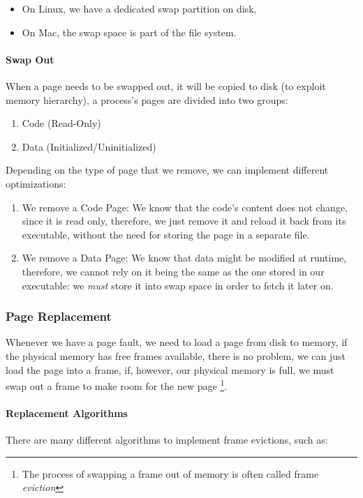 \documentclass[openright, twoside]{report}
\theoremstyle{definition}
\theoremstyle{example}
\begin{document}
\begin{itemize}
	\item On Linux, we have a dedicated swap partition on disk,
	\item On Mac, the swap space is part of the file system.
\end{itemize}

\paragraph{Swap Out}
When a page needs to be swapped out, it will be copied to disk (to exploit 
memory hierarchy), a process's pages are divided into two groups:
\begin{enumerate}
	\item Code (Read-Only)
	\item Data (Initialized/Uninitialized)
\end{enumerate}

Depending on the type of page that we remove, we can implement different optimizations:
\begin{enumerate}
	\item We remove a Code Page:
	We know that the code's content does not change, since it is read only, therefore, 
	we just remove it and reload it back from its executable, without the need for storing the 
	page in a separate file.
	\item We remove a Data Page:
	We know that data might be modified at runtime, therefore, we cannot rely on it being the 
	same as the one stored in our executable: we \emph{must} store it into swap space 
	in order to fetch it later on.
\end{enumerate}

\subsubsection{Page Replacement}
Whenever we have a page fault, we need to load a page from disk to memory, if 
the physical memory has free frames available, there is no problem, we can just load 
the page into a frame, if, however, our physical memory is full, we must swap out a frame
to make room for the new page \footnote{The process of swapping a frame out of memory 
is often called frame \emph{eviction}}.

\paragraph{Replacement Algorithms}
There are many different algorithms to implement frame evictions, such as:
\end{document}
